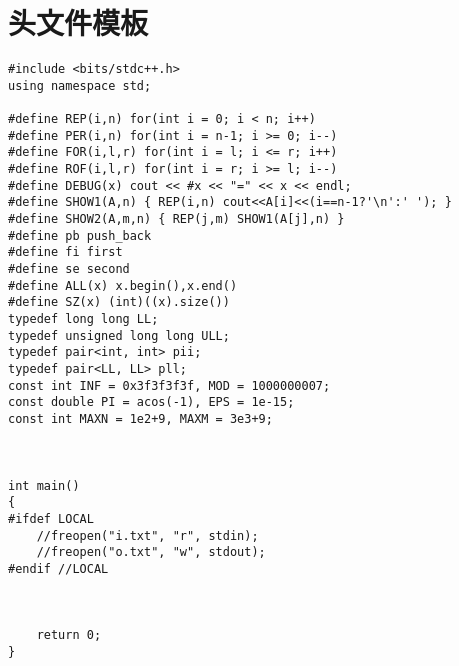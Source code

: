 \section{头文件模板}

\begin{lstlisting}
#include <bits/stdc++.h>
using namespace std;

#define REP(i,n) for(int i = 0; i < n; i++)
#define PER(i,n) for(int i = n-1; i >= 0; i--)
#define FOR(i,l,r) for(int i = l; i <= r; i++)
#define ROF(i,l,r) for(int i = r; i >= l; i--)
#define DEBUG(x) cout << #x << "=" << x << endl;
#define SHOW1(A,n) { REP(i,n) cout<<A[i]<<(i==n-1?'\n':' '); }
#define SHOW2(A,m,n) { REP(j,m) SHOW1(A[j],n) }
#define pb push_back
#define fi first
#define se second
#define ALL(x) x.begin(),x.end()
#define SZ(x) (int)((x).size())
typedef long long LL;
typedef unsigned long long ULL;
typedef pair<int, int> pii;
typedef pair<LL, LL> pll;
const int INF = 0x3f3f3f3f, MOD = 1000000007;
const double PI = acos(-1), EPS = 1e-15;
const int MAXN = 1e2+9, MAXM = 3e3+9;



int main()
{
#ifdef LOCAL
    //freopen("i.txt", "r", stdin);
    //freopen("o.txt", "w", stdout);
#endif //LOCAL

    

    return 0;
}
\end{lstlisting}